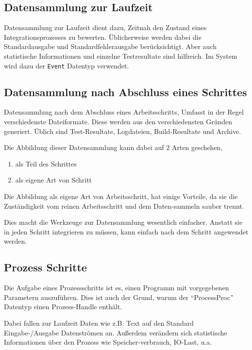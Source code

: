 \subsection{Datensammlung zur Laufzeit}

Datensammlung zur Laufzeit dient dazu, Zeitnah den Zustand eines Integrationsprozesses zu bewerten.
Üblicherweise werden dabei die Standardausgabe und Standardfehlerausgabe berücksichtigt. Aber auch statistische Informationen und einzelne Testresultate sind hilfreich. Im System wird dazu der \verb|Event| Datentyp verwendet.

\subsection{Datensammlung nach Abschluss eines Schrittes}

Datensammlung nach dem Abschluss eines Arbeitsschritts,
Umfasst in der Regel verschiedenste Dateiformate.
Diese werden aus den verschiedensten Gründen generiert.
Üblich sind Test-Resultate, Logdateien, Build-Resultate und Archive.

Die Abbildung dieser Datensammlung kann dabei auf 2 Arten geschehen,

\begin{enumerate}
    \item als Teil des Schrittes
    \item als eigene Art von Schritt
\end{enumerate}

Die Abbildung als eigene Art von Arbeitsschritt,
hat einige Vorteile, da sie die Zuständigkeit vom reinen Arbeitsschritt
und dem Daten-sammeln sauber trennt.

Dies macht die Werkzeuge zur Datensammlung wesentlich einfacher.
Anstatt sie in jeden Schritt integrieren zu müssen,
kann einfach nach dem Schritt angewendet werden.

\subsection{Prozess Schritte}

Die Aufgabe eines Prozessschritts ist es,
einen Programm mit vorgegebenen Parametern auszuführen.
Dies ist auch der Grund, warum der ``ProcessProc'' Datentyp einen
Prozess-Handle enthält.

Dabei fallen zur Laufzeit Daten wie z.B. Text auf den Standard Eingabe-/Ausgabe Datenströmen an.
Außerdem verändern sich statistische Informationen über den Prozess wie Speicher-verbrauch, IO-Last, u.a.


